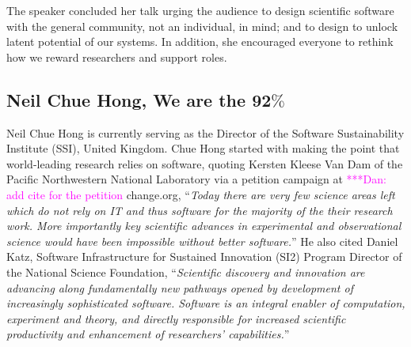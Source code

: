 \documentclass[11pt, oneside]{amsart}
\newcommand{\katznote}[1]{ {\textcolor{magenta}    { ***Dan:      #1 }}}
\begin{document}
The speaker concluded her talk urging the audience to design scientific software
with the general community, not an individual, in mind; and to design to unlock
latent potential of our systems. In addition, she encouraged everyone to rethink
how we reward researchers and support roles.


\subsection{Neil Chue Hong, We are the 92$\%$} 
\label{keynote2}
\begin{comment}
In a recent survey of UK research-intensive universities, 92\% of researchers
said they used research software and 68\% said their research would be impossible
without software. Yet 71\% have had no formal software training, and few are
ready to apply many of the things we take for granted such as testing or
virtualization. WSSSPE represents the pinnacle of what we understand to be the
best practice around scientific software in our community. My talk will
challenge the workshop participants to come up with ways of taking this best
practice to those 92\% of researchers in a way that will lead to maximum benefit
to the scientific community.
 \end{comment}


Neil Chue Hong is currently serving as the Director of the Software
Sustainability Institute (SSI), United Kingdom. Chue Hong started with making
the point that world-leading research relies on software, quoting Kersten Kleese
Van Dam of the Pacific Northwestern National Laboratory via a petition campaign at \katznote{add cite for the petition} 
change.org, ``\emph{Today there are very few science
areas left which do not rely on IT and thus software for the majority of the
their research work. More importantly key scientific advances in experimental
and observational science would have been impossible without better software.}''
He also cited Daniel Katz, Software Infrastructure for Sustained Innovation
(SI2) Program Director of the National Science Foundation, ``\emph{Scientific
discovery and innovation are advancing along fundamentally new pathways opened
by development of increasingly sophisticated software. Software is an integral
enabler of computation, experiment and theory, and directly responsible for
increased scientific productivity and enhancement of researchers'
capabilities.}''
\end{document}
